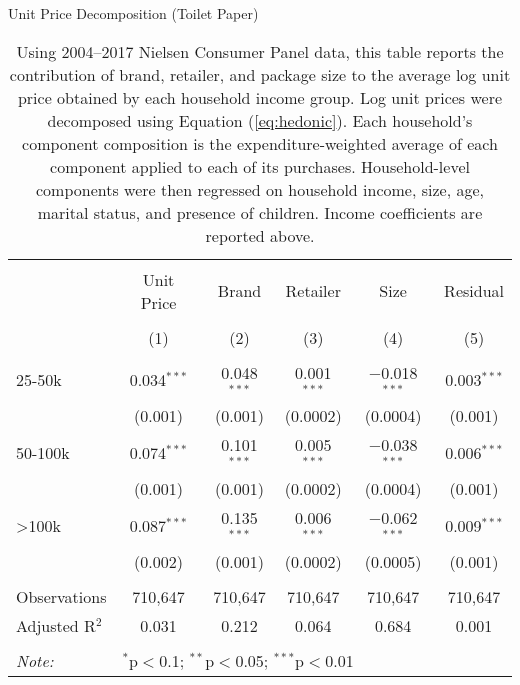 \begin{table}[!htbp] \centering
  \caption{Unit Price Decomposition (Toilet Paper)}
  \label{tab:tpPriceDecomp}
\begin{tabular}{@{\extracolsep{5pt}}lccccc}
\\[-1.8ex]\hline
\hline \\[-1.8ex]
 & Unit Price & Brand & Retailer & Size & Residual \\
\\[-1.8ex] & (1) & (2) & (3) & (4) & (5)\\
\hline \\[-1.8ex]
 25-50k & 0.034$^{***}$ & 0.048$^{***}$ & 0.001$^{***}$ & $-$0.018$^{***}$ & 0.003$^{***}$ \\
  & (0.001) & (0.001) & (0.0002) & (0.0004) & (0.001) \\
  50-100k & 0.074$^{***}$ & 0.101$^{***}$ & 0.005$^{***}$ & $-$0.038$^{***}$ & 0.006$^{***}$ \\
  & (0.001) & (0.001) & (0.0002) & (0.0004) & (0.001) \\
  >100k & 0.087$^{***}$ & 0.135$^{***}$ & 0.006$^{***}$ & $-$0.062$^{***}$ & 0.009$^{***}$ \\
  & (0.002) & (0.001) & (0.0002) & (0.0005) & (0.001) \\
 \hline \\[-1.8ex]
Observations & 710,647 & 710,647 & 710,647 & 710,647 & 710,647 \\
Adjusted R$^{2}$ & 0.031 & 0.212 & 0.064 & 0.684 & 0.001 \\
\hline
\hline \\[-1.8ex]
\textit{Note:}  & \multicolumn{5}{l}{$^{*}$p$<$0.1; $^{**}$p$<$0.05; $^{***}$p$<$0.01} \\
\end{tabular}
\caption*{Using 2004--2017 Nielsen Consumer Panel data, this table reports the contribution of brand, retailer, and package size to the average log unit price obtained by each household income group. Log unit prices were decomposed using Equation (\ref{eq:hedonic}). Each household's component composition is the expenditure-weighted average of each component applied to each of its purchases. Household-level components were then regressed on household income, size, age, marital status, and presence of children. Income coefficients are reported above.}
\end{table}
